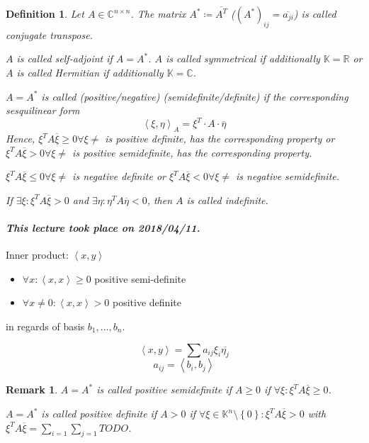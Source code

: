 \documentclass{article}
\newtheorem{definition}{Definition}  \numberwithin{definition}{section}
\newtheorem{remark}{Remark}  \numberwithin{remark}{section}
\newcommand{\set}[1]{\left\{#1\right\}}
\newcommand{\angel}[1]{\left\langle#1\right\rangle}
\newcommand{\dateref}[1]{\paragraph{\textit{This lecture took place on #1.}}}
\begin{document}
\begin{definition} %
  Let $A \in \mathbb C^{n \times n}$.
  The matrix $A^* \coloneqq \overline{A^T}$ ($(A^*)_{ij} = \overline{a_{ji}}$)
  is called \emph{conjugate transpose}.

  $A$ is called \emph{self-adjoint} if $A = A^*$.
  $A$ is called \emph{symmetrical} if additionally $\mathbb K = \mathbb R$
  or $A$ is called \emph{Hermitian} if additionally $\mathbb K = \mathbb C$.

  $A = A^*$ is called (positive/negative) (semidefinite/definite) if the corresponding sesquilinear form
  \[ \angel{\xi, \eta}_A = \xi^T \cdot A \cdot \overline{\eta} \]
  Hence, $\xi^T A \overline{\xi} \geq 0 \forall \xi \neq$ is positive definite, has the corresponding property or
  $\xi^T A \overline{\xi} > 0 \forall \xi \neq$ is positive semidefinite, has the corresponding property.

  $\xi^T A \overline{\xi} \leq 0 \forall \xi \neq$ is negative definite or
  $\xi^T A \overline{\xi} < 0 \forall \xi \neq$ is negative semidefinite.

  If $\exists \xi: \xi^T A \overline{\xi} > 0$ and $\exists \eta: \eta^T A \overline{\eta} < 0$, then $A$ is called indefinite.
\end{definition}

\dateref{2018/04/11}

Inner product: $\angel{x,y}$
\begin{itemize}
  \item $\forall x: \angel{x,x} \geq 0$ positive semi-definite
  \item $\forall x \neq 0: \angel{x,x} > 0$ positive definite
\end{itemize}
in regards of basis $b_1, \dots, b_n$.

\[ \angel{x,y} = \sum a_{ij} \xi_i \overline{\eta_j} \]
\[ a_{ij} = \angel{b_i, b_j} \]

\begin{remark}
  $A = A^*$ is called \emph{positive semidefinite} if $A \geq 0$ if $\forall \xi: \xi^T A \overline{\xi} \geq 0$.

  $A = A^*$ is called \emph{positive definite} if $A > 0$ if $\forall \xi \in \mathbb K^n\setminus \set{0}: \xi^T A \overline{\xi} > 0$
  with $\xi^T A \overline{\xi} = \sum_{i=1} \sum_{j=1} TODO$.
\end{remark}
\end{document}
